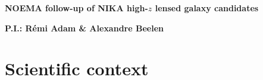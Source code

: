 \documentclass[11pt,a4paper,twoside,graphicx,color]{article}
\begin{document}
%
%
\begin{center}{\LARGE \bf
NOEMA follow-up of NIKA high-$z$ lensed galaxy candidates
}\end{center}
%
\centerline{\bf P.I.: R\'emi Adam \& Alexandre Beelen}



\section{Scientific context}
\end{document}
